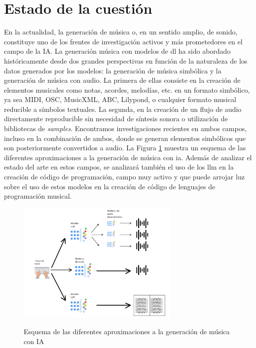 \section{Estado de la cuestión}
\label{chap:estado_cuestion}


En la actualidad, la generación de música o, en un sentido amplio, de sonido, constituye uno de los frentes de investigación activos y más prometedores en el campo de la IA. La generación música con modelos de \gls{dl} ha sido abordado históricamente desde dos grandes perspectivas en función de la naturaleza de los datos generados por los modelos: la generación de música simbólica y la generación de música con audio. La primera de ellas consiste en la creación de elementos musicales como notas, acordes, melodías, etc. en un formato simbólico, ya sea MIDI, OSC, MusicXML, ABC, Lilypond, o cualquier formato musical reducible a símbolos textuales. La segunda, en la creación de un flujo de audio directamente reproducible sin necesidad de síntesis sonora o utilización de bibliotecas de \emph{samples}. Encontramos investigaciones recientes en ambos campos, incluso en la combinación de ambos, donde se generan elementos simbólicos que son posteriormente convertidos a audio. La Figura \ref{fig:generacion_musica_estado_cuestion} muestra un esquema de las diferentes aproximaciones a la generación de música con \gls{ia}. Además de analizar el estado del arte en estos campos, se analizará también el uso de los \gls{llm} en la creación de código de programación, campo muy activo y que puede arrojar luz sobre el uso de estos modelos en la creación de código de lenguajes de programación musical.

\begin{figure}[H]
    \caption{Esquema de las diferentes aproximaciones a la generación de música con IA}
    \centering
    \includegraphics[width=0.7\textwidth]{./figuras/generacion_musica_estado_cuestion.png}
    \source{\propio}
    \label{fig:generacion_musica_estado_cuestion}
\end{figure}

